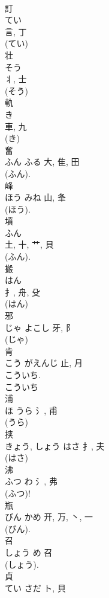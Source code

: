 \documentclass[8pt]{extreport}
\begin{document}
\begin{CJK}{UTF8}{min}
\\	訂	
\\	てい	
\\	言, 丁	
\\	(てい) 
\\	壮	
\\	そう	
\\	丬, 士	
\\	(そう) 
\\	軌	
\\	き	
\\	車, 九	
\\	(き) 
\\	奮	
\\	ふん	ふる	大, 隹, 田	
\\	(ふん).	
\\	峰	
\\	ほう	みね	山, 夆	
\\	(ほう). 
\\	墳	
\\	ふん	
\\	土, 十, 艹, 貝	
\\	(ふん). 
\\	搬	
\\	はん	
\\	扌, 舟, 殳	
\\	(はん) 
\\	邪	
\\	じゃ	よこし	牙, 阝	
\\	(じゃ) 
\\	肯	
\\	こう	がえんじ	止, 月	
\\	こういち.
\\	こういち 
\\	浦	
\\	ほ	うら	氵, 甫	
\\	(うら) 
\\	挟	
\\	きょう, しょう	はさ	扌, 夫		
\\	(はさ) 
\\	沸	
\\	ふつ	わ	氵, 弗	
\\	(ふつ)! 
\\	瓶	
\\	びん	かめ	开, 万, 丶, 一		
\\	(びん). 
\\	召	
\\	しょう	め	召	
\\	(しょう). 
\\	貞	
\\	てい	さだ	ト, 貝	

\end{CJK}
\end{document}
